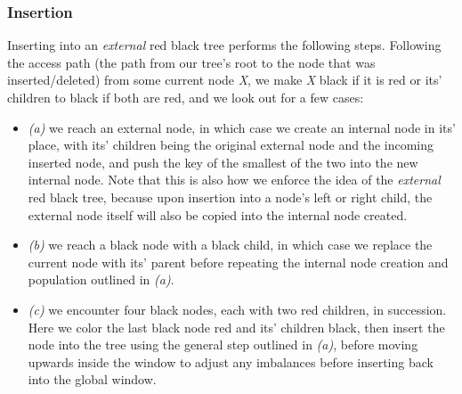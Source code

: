 \documentclass[letterpaper, 10 pt, conference]{ieeeconf}
\begin{document}
	 \subsubsection{Insertion}
	 Inserting into an \textit{external} red black tree performs the following steps. Following the access path (the path from our tree's root to the node that was inserted/deleted) from some current node \textit{X}, we make \textit{X} black if it is red or its' children to black if both are red, and we look out for a few cases:
	 \begin{itemize}
	 	\item \textit{(a)} we reach an external node, in which case we create an internal node in its' place, with its' children being the original external node and the incoming inserted node, and push the key of the smallest of the two into the new internal node. Note that this is also how we enforce the idea of the \textit{external} red black tree, because upon insertion into a node's left or right child, the external node itself will also be copied into the internal node created. 
	 	\item \textit{(b)} we reach a black node with a black child, in which case we replace the current node with its' parent before repeating the internal node creation and population outlined in \textit{(a)}.
	 	\item \textit{(c)} we encounter four black nodes, each with two red children, in succession. Here we color the last black node red and its' children black, then insert the node into the tree using the general step outlined in \textit{(a)}, before moving upwards inside the window to adjust any imbalances before inserting back into the global window.
	 \end{itemize}
\end{document}
